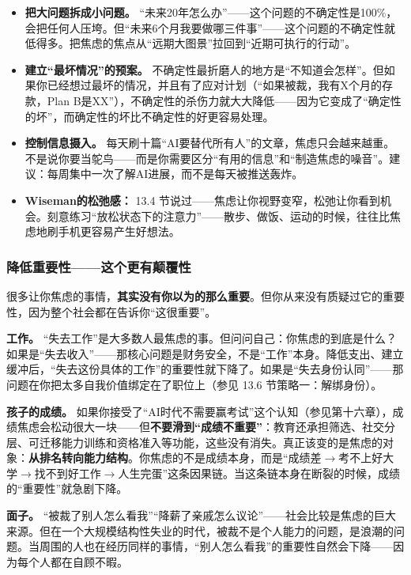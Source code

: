 \documentclass[11pt,a4paper]{ctexart}
\begin{document}
\begin{itemize}
  \item \textbf{把大问题拆成小问题。} “未来20年怎么办”——这个问题的不确定性是100\%，会把任何人压垮。但“未来6个月我要做哪三件事”——这个问题的不确定性就低得多。把焦虑的焦点从“远期大图景”拉回到“近期可执行的行动”。
  \item \textbf{建立“最坏情况”的预案。} 不确定性最折磨人的地方是“不知道会怎样”。但如果你已经想过最坏的情况，并且有了应对计划（“如果被裁，我有X个月的存款，Plan B是XX”），不确定性的杀伤力就大大降低——因为它变成了“确定性的坏”，而确定性的坏比不确定性的好更容易处理。
  \item \textbf{控制信息摄入。} 每天刷十篇“AI要替代所有人”的文章，焦虑只会越来越重。不是说你要当鸵鸟——而是你需要区分“有用的信息”和“制造焦虑的噪音”。建议：每周集中一次了解AI进展，而不是每天被推送轰炸。
  \item \textbf{Wiseman的松弛感：} 13.4 节说过——焦虑让你视野变窄，松弛让你看到机会。刻意练习“放松状态下的注意力”——散步、做饭、运动的时候，往往比焦虑地刷手机更容易产生好想法。
\end{itemize}

\subsubsection{降低重要性——这个更有颠覆性}

很多让你焦虑的事情，\textbf{其实没有你以为的那么重要}。但你从来没有质疑过它的重要性，因为整个社会都在告诉你“这很重要”。

\textbf{工作。} “失去工作”是大多数人最焦虑的事。但问问自己：你焦虑的到底是什么？如果是“失去收入”——那核心问题是财务安全，不是“工作”本身。降低支出、建立缓冲后，“失去这份具体的工作”的重要性就下降了。如果是“失去身份认同”——那问题在你把太多自我价值绑定在了职位上（参见 13.6 节策略一：解绑身份）。

\textbf{孩子的成绩。} 如果你接受了“AI时代不需要赢考试”这个认知（参见第十六章），成绩焦虑会松动很大一块——但\textbf{不要滑到“成绩不重要”}：教育还承担筛选、社交分层、可迁移能力训练和资格准入等功能，这些没有消失。真正该变的是焦虑的对象：\textbf{从排名转向能力结构}。你焦虑的不是成绩本身，而是“成绩差$\to$考不上好大学$\to$找不到好工作$\to$人生完蛋”这条因果链。当这条链本身在断裂的时候，成绩的“重要性”就急剧下降。

\textbf{面子。} “被裁了别人怎么看我”“降薪了亲戚怎么议论”——社会比较是焦虑的巨大来源。但在一个大规模结构性失业的时代，被裁不是个人能力的问题，是浪潮的问题。当周围的人也在经历同样的事情，“别人怎么看我”的重要性自然会下降——因为每个人都在自顾不暇。
\end{document}
